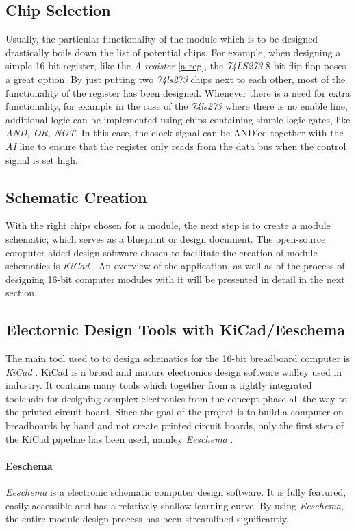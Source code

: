 \subsection{Chip Selection}
Usually, the particular functionality of the module which is to be designed drastically boils down the list of potential chips.
For example, when designing a simple 16-bit register, like the \emph{A register} \ref{a-reg}, the \emph{74LS273} 8-bit flip-flop
\cite{74ls273} poses a great option. By just putting two \emph{74ls273} chips next to each other, most of the functionality of the
register has been designed. Whenever there is a need for extra functionality, for example in the case of the \emph{74ls273}
where there is no enable line, additional logic can be implemented using chips containing simple logic gates, like \emph{AND, OR,
NOT}. In this case, the clock signal can be AND'ed together with the \emph{AI} line to ensure that the register only reads from the
data bus when the control signal is set high.

\subsection{Schematic Creation}
With the right chips chosen for a module, the next step is to create a module schematic, which serves as a blueprint or design
document. The open-source computer-aided design software chosen to facilitate the creation of module schematics is \emph{KiCad}
\cite{kicad}. An overview of the application, as well as of the process of designing 16-bit computer modules with it will be
presented in detail in the next section.

\subsection{Electornic Design Tools with KiCad/Eeschema}
The main tool used to to design schematics for the 16-bit breadboard computer is \emph{KiCad} \cite{kicad}. KiCad is a broad and
mature electronics design software widley used in industry. It contains many tools which together from a tightly integrated
toolchain for designing complex electronics from the concept phase all the way to the printed circuit board. Since the goal of the
project is to build a computer on breadboards by hand and not create printed circuit boards, only the first step of the KiCad
pipeline has been used, namley \emph{Eeschema} \cite{eeschema}.

\paragraph{Eeschema}
\emph{Eeschema} is a electronic schematic computer design software. It is fully featured, easily accessible and has a relatively
shallow learning curve. By using \emph{Eeschema,} the entire module design process has been streamlined significantly.

